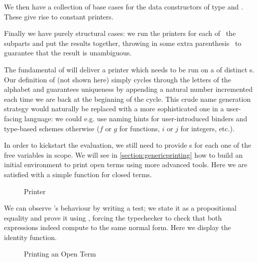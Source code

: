 We then have a collection of base cases for the data constructors of type
 and . These give rise to constant printers.


Finally we have purely structural cases: we run the printers for each of~
the subparts and put the results together, throwing in some extra parenthesis~
to guarantee that the result is unambiguous.



The fundamental  of  will deliver a printer which needs to be run
on a  of distinct s. Our definition of  (not
shown here) simply cycles through the letters of the alphabet and guarantees
uniqueness by appending a natural number incremented each time we are back at
the beginning of the cycle. This crude name generation strategy would naturally
be replaced with a more sophisticated one in a user-facing language: we could
e.g. use naming hints for user-introduced binders and type-based schemes otherwise
($f$ or $g$ for functions, $i$ or $j$ for integers, etc.).

In order to kickstart the evaluation, we still need to provide s for each
one of the free variables in scope. We will see in \cref{section:genericprinting}
how to build an initial environment to print open terms using more advanced tools.
Here we are satisfied with a simple  function for closed terms.

\begin{figure}[h]
\caption{Printer\label{fig:printer}}
\end{figure}

We can observe 's behaviour by writing a test; we state it as a
propositional equality and prove it using , forcing the typechecker
to check that both expressions indeed compute to the same normal form. Here
we display the identity function.

\begin{figure}[h]
\caption{Printing an Open Term\label{fig:printtest}}
\end{figure}
